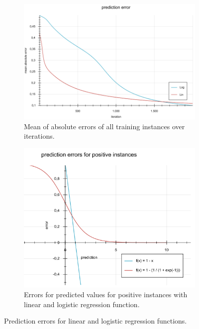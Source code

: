 \documentclass[10pt]{reportMaster}
\begin{document}
\begin{figure}
	\begin{subfigure}{0.5\textwidth}
		\centering
		\includegraphics[width=1\textwidth]{figures/experiments/errorsLogLin43}
		\caption{Mean of absolute errors of all training instances over iterations.}
		\label{fig:errorsLogLin43}
	\end{subfigure}
	\begin{subfigure}{0.5\textwidth}
		\centering
		\includegraphics[width=1\textwidth]{figures/experiments/predictionErrors}
		\caption{Errors for predicted values for positive instances with linear and logistic regression function.}
		\label{fig:predictionErrors}
	\end{subfigure}
	\caption{Prediction errors for linear and logistic regression functions.}
	\label{fig:errors}
\end{figure}
\end{document}
